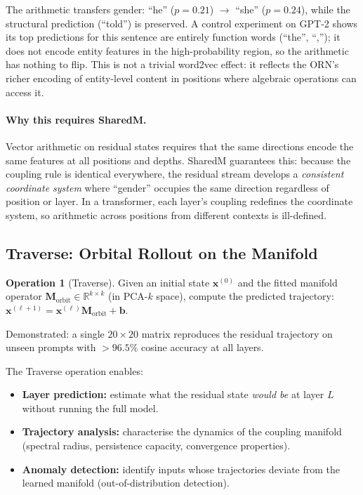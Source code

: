 \documentclass[11pt, a4paper]{article}
\newcommand{\M}{\mathbf{M}}
\newcommand{\x}{\mathbf{x}}
\newcommand{\R}{\mathbb{R}}
\theoremstyle{plain}
\theoremstyle{definition}
\newtheorem{operation}{Operation}
\theoremstyle{remark}
\begin{document}
The arithmetic transfers gender: ``he'' ($p{=}0.21$) $\to$ ``she'' ($p{=}0.24$), while the structural prediction (``told'') is preserved.
A control experiment on GPT-2 shows its top predictions for this sentence are entirely function words (``the'', ``,''); it does not encode entity features in the high-probability region, so the arithmetic has nothing to flip.
This is not a trivial word2vec effect: it reflects the ORN's richer encoding of entity-level content in positions where algebraic operations can access it.

\paragraph{Why this requires SharedM.}
Vector arithmetic on residual states requires that the same directions encode the same features at all positions and depths.
SharedM guarantees this: because the coupling rule is identical everywhere, the residual stream develops a \emph{consistent coordinate system} where ``gender'' occupies the same direction regardless of position or layer.
In a transformer, each layer's coupling redefines the coordinate system, so arithmetic across positions from different contexts is ill-defined.

\subsection{Traverse: Orbital Rollout on the Manifold}

\begin{operation}[Traverse]
Given an initial state $\x^{(0)}$ and the fitted manifold operator $\M_{\text{orbit}} \in \R^{k \times k}$ (in PCA-$k$ space), compute the predicted trajectory: $\x^{(\ell+1)} = \x^{(\ell)} \M_{\text{orbit}} + \mathbf{b}$.
\end{operation}

Demonstrated: a single $20 \times 20$ matrix reproduces the residual trajectory on unseen prompts with $>96.5\%$ cosine accuracy at all layers.

The Traverse operation enables:
\begin{itemize}[nosep]
\item \textbf{Layer prediction:} estimate what the residual state \emph{would be} at layer $L$ without running the full model.
\item \textbf{Trajectory analysis:} characterise the dynamics of the coupling manifold (spectral radius, persistence capacity, convergence properties).
\item \textbf{Anomaly detection:} identify inputs whose trajectories deviate from the learned manifold (out-of-distribution detection).
\end{itemize}
\end{document}
